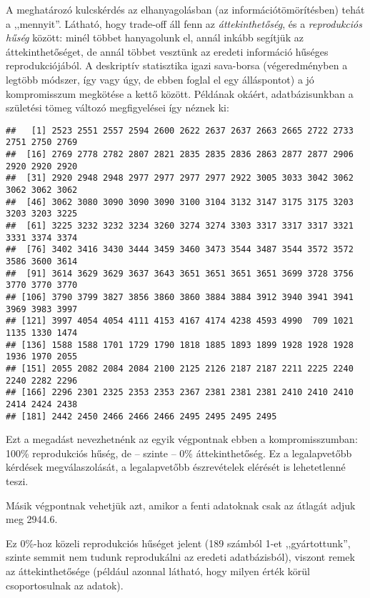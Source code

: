 \documentclass[
]{book}
\newenvironment{Shaded}{\begin{snugshade}}{\end{snugshade}}
\newcommand{\NormalTok}[1]{#1}
\newcommand{\OperatorTok}[1]{\textcolor[rgb]{0.81,0.36,0.00}{\textbf{#1}}}
\begin{document}
A meghatározó kulcskérdés az elhanyagolásban (az információtömörítésben) tehát a ,,mennyit''. Látható, hogy trade-off áll fenn az \emph{áttekinthetőség}, és a \emph{reprodukciós hűség} között: minél többet hanyagolunk el, annál inkább segítjük az áttekinthetőséget, de annál többet vesztünk az eredeti információ hűséges reprodukciójából. A deskriptív statisztika igazi sava-borsa (végeredményben a legtöbb módszer, így vagy úgy, de ebben foglal el egy álláspontot) a jó kompromisszum megkötése a kettő között. Példának okáért, adatbázisunkban a születési tömeg változó megfigyelései így néznek ki:

\begin{Shaded}
\end{Shaded}

\begin{verbatim}
##   [1] 2523 2551 2557 2594 2600 2622 2637 2637 2663 2665 2722 2733 2751 2750 2769
##  [16] 2769 2778 2782 2807 2821 2835 2835 2836 2863 2877 2877 2906 2920 2920 2920
##  [31] 2920 2948 2948 2977 2977 2977 2977 2922 3005 3033 3042 3062 3062 3062 3062
##  [46] 3062 3080 3090 3090 3090 3100 3104 3132 3147 3175 3175 3203 3203 3203 3225
##  [61] 3225 3232 3232 3234 3260 3274 3274 3303 3317 3317 3317 3321 3331 3374 3374
##  [76] 3402 3416 3430 3444 3459 3460 3473 3544 3487 3544 3572 3572 3586 3600 3614
##  [91] 3614 3629 3629 3637 3643 3651 3651 3651 3651 3699 3728 3756 3770 3770 3770
## [106] 3790 3799 3827 3856 3860 3860 3884 3884 3912 3940 3941 3941 3969 3983 3997
## [121] 3997 4054 4054 4111 4153 4167 4174 4238 4593 4990  709 1021 1135 1330 1474
## [136] 1588 1588 1701 1729 1790 1818 1885 1893 1899 1928 1928 1928 1936 1970 2055
## [151] 2055 2082 2084 2084 2100 2125 2126 2187 2187 2211 2225 2240 2240 2282 2296
## [166] 2296 2301 2325 2353 2353 2367 2381 2381 2381 2410 2410 2410 2414 2424 2438
## [181] 2442 2450 2466 2466 2466 2495 2495 2495 2495
\end{verbatim}

Ezt a megadást nevezhetnénk az egyik végpontnak ebben a kompromisszumban: 100\% reprodukciós hűség, de -- szinte -- 0\% áttekinthetőség. Ez a legalapvetőbb kérdések megválaszolását, a legalapvetőbb észrevételek elérését is lehetetlenné teszi.

Másik végpontnak vehetjük azt, amikor a fenti adatoknak csak az átlagát adjuk meg 2944.6.

Ez 0\%-hoz közeli reprodukciós hűséget jelent (189 számból 1-et ,,gyártottunk'', szinte semmit nem tudunk reprodukálni az eredeti adatbázisból), viszont remek az áttekinthetősége (például azonnal látható, hogy milyen érték körül csoportosulnak az adatok).
\end{document}
